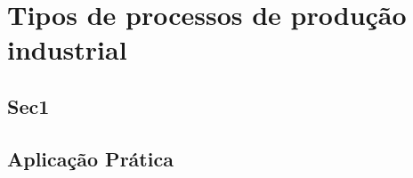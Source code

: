 \chapter{Tipos de processos de produção industrial} 
\label{chap:tipos_de_processo_de_producao} 

\section{Sec1} 
\label{sec:tipos_de_processo_de_producao_sec1} 


\section{Aplicação Prática} 
\label{sec:tipos_de_processo_de_producao_aplicacao}